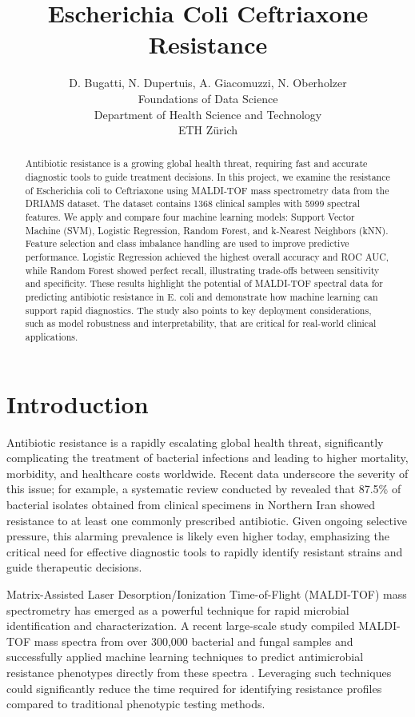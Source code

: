 \documentclass{article}
\title{Escherichia Coli Ceftriaxone Resistance}
\author{%
  D. Bugatti, N. Dupertuis, A. Giacomuzzi, N. Oberholzer\\
  Foundations of Data Science\\
  Department of Health Science and Technology\\
  ETH Zürich\\
}
\begin{document}
\maketitle

\begin{abstract}
Antibiotic resistance is a growing global health threat, requiring fast and accurate diagnostic tools to guide treatment decisions. In this project, we examine the resistance of Escherichia coli to Ceftriaxone using MALDI-TOF mass spectrometry data from the DRIAMS dataset. The dataset contains 1368 clinical samples with 5999 spectral features. We apply and compare four machine learning models: Support Vector Machine (SVM), Logistic Regression, Random Forest, and k-Nearest Neighbors (kNN). Feature selection and class imbalance handling are used to improve predictive performance. Logistic Regression achieved the highest overall accuracy and ROC AUC, while Random Forest showed perfect recall, illustrating trade-offs between sensitivity and specificity. These results highlight the potential of MALDI-TOF spectral data for predicting antibiotic resistance in E. coli and demonstrate how machine learning can support rapid diagnostics. The study also points to key deployment considerations, such as model robustness and interpretability, that are critical for real-world clinical applications.
\end{abstract}


\section{Introduction}

Antibiotic resistance is a rapidly escalating global health threat, significantly complicating the treatment of bacterial infections and leading to higher mortality, morbidity, and healthcare costs worldwide. Recent data underscore the severity of this issue; for example, a systematic review conducted by \citet{IranBacteria} revealed that 87.5\% of bacterial isolates obtained from clinical specimens in Northern Iran showed resistance to at least one commonly prescribed antibiotic. Given ongoing selective pressure, this alarming prevalence is likely even higher today, emphasizing the critical need for effective diagnostic tools to rapidly identify resistant strains and guide therapeutic decisions.

Matrix-Assisted Laser Desorption/Ionization Time-of-Flight (MALDI-TOF) mass spectrometry has emerged as a powerful technique for rapid microbial identification and characterization. A recent large-scale study compiled MALDI-TOF mass spectra from over 300,000 bacterial and fungal samples and successfully applied machine learning techniques to predict antimicrobial resistance phenotypes directly from these spectra \citep{datasetExplaination}. Leveraging such techniques could significantly reduce the time required for identifying resistance profiles compared to traditional phenotypic testing methods.
\end{document}
